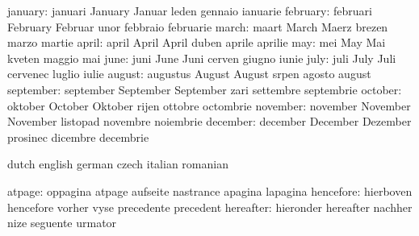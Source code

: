                   january: januari                   January
                           Januar                    leden
                           gennaio                   ianuarie
                 february: februari                  February
                           Februar                   unor
                           febbraio                  februarie
                    march: maart                     March
                           Maerz                     brezen
                           marzo                     martie
                    april: april                     April
                           April                     duben
                           aprile                    aprilie
                      may: mei                       May
                           Mai                       kveten
                           maggio                    mai
                     june: juni                      June
                           Juni                      cerven
                           giugno                    iunie
                     july: juli                      July
                           Juli                      cervenec
                           luglio                    iulie
                   august: augustus                  August
                           August                    srpen
                           agosto                    august
                september: september                 September
                           September                 zari
                           settembre                 septembrie
                  october: oktober                   October
                           Oktober                   rijen
                           ottobre                   octombrie
                 november: november                  November
                           November                  listopad
                           novembre                  noiembrie
                 december: december                  December
                           Dezember                  prosinec
                           dicembre                  decembrie
\stopvariables


\startvariables            dutch                     english
                           german                    czech
                           italian                   romanian

                   atpage: oppagina                  atpage
                           aufseite                  nastrance
                           apagina                   lapagina
                hencefore: hierboven                 hencefore
                           vorher                    vyse
                           precedente                precedent
                hereafter: hieronder                 hereafter
                           nachher                   nize
                           seguente                  urmator

